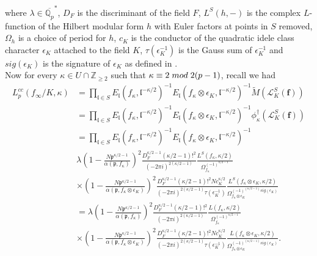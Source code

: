 \documentclass[reqno,10pt]{amsart}
\newcommand{\qp}{\mathbb{Q}_{p}}
\newcommand{\z}{\mathbb{Z}}
\newcommand{\f}{\mathbf{f}}
\newcommand{\p}{\mathfrak{p}}
\theoremstyle{plain}
\theoremstyle{definition}
\begin{document}
where $\lambda \in \overline{\qp}^*$, $D_F$ is the discriminant of the field $F$, $L^S(h,-)$ is the complex $L$-function of the Hilbert modular form $h$ with Euler factors at points in $S$ removed, $\Omega_{h}$ is a choice of period for $h$, $c_K$ is the conductor of the quadratic idele class character $\epsilon_K$ attached to the field $K$, $\tau(\epsilon_K^{-1})$ is the Gauss sum of $\epsilon_K^{-1}$ and $sig(\epsilon_K)$ is the signature of $\epsilon_K$ as defined in \cite[Section 5.1]{MokHeegnerPoints}. \\
Now for every $\kappa \in U \cap \z_{\geq 2}$ such that $\kappa \equiv 2 \hspace{1mm} mod \hspace{1mm} 2(p-1)$, recall we had
\begin{align*}
    L_p^{cc}(f_\infty/K,\kappa) & = \prod_{\mathfrak{l} \in S} E_\mathfrak{l}(f_\kappa, \mathfrak{l}^{-\kappa/2})^{-1} E_\mathfrak{l}(f_\kappa \otimes \epsilon_K, \mathfrak{l}^{-\kappa/2})^{-1} \widetilde{M}(\mathcal{L}^S_K(\f)) \\
    & = \prod_{\mathfrak{l} \in S} E_\mathfrak{l}(f_\kappa, \mathfrak{l}^{-\kappa/2})^{-1} E_\mathfrak{l}(f_\kappa \otimes \epsilon_K, \mathfrak{l}^{-\kappa/2})^{-1} \phi_\kappa^\dagger(\mathcal{L}^S_K(\f)) \\
    & = \prod_{\mathfrak{l} \in S} E_\mathfrak{l}(f_\kappa, \mathfrak{l}^{-\kappa/2})^{-1} E_\mathfrak{l}(f_\kappa \otimes \epsilon_K, \mathfrak{l}^{-\kappa/2})^{-1} \\
    & \lambda \left(1 - \frac{N\p^{\kappa/2 - 1}}{\alpha(\p,f_\kappa)} \right)^2 \frac{D_F^{\kappa/2 - 1}(\kappa/2 - 1)!^2}{(-2\pi i)^{2(\kappa/2-1)}} \frac{L^S(f_\kappa,\kappa/2)}{\Omega_{f_{\kappa}}^{(-1)^{\kappa/2-1}}} \\
    & \times \left(1 - \frac{N\p^{\kappa/2 - 1}}{\alpha(\p,f_\kappa \otimes \epsilon_K)} \right)^2 \frac{D_F^{\kappa/2 - 1}(\kappa/2 - 1)!^2 Nc_K^{\kappa/2}}{(-2\pi i)^{2(\kappa/2-1)} \tau(\epsilon_K^{-1})} \frac{L^S(f_\kappa \otimes \epsilon_K,\kappa/2)}{\Omega_{f_{\kappa} \otimes \epsilon_K}^{(-1)^{(\kappa/2-1)}sig(\epsilon_K)}} \\
    & = \lambda \left(1 - \frac{N\p^{\kappa/2 - 1}}{\alpha(\p,f_\kappa)} \right)^2 \frac{D_F^{\kappa/2 - 1}(\kappa/2 - 1)!^2}{(-2\pi i)^{2(\kappa/2-1)}} \frac{L(f_\kappa,\kappa/2)}{\Omega_{f_{\kappa}}^{(-1)^{\kappa/2-1}}} \\
    & \times \left(1 - \frac{N\p^{\kappa/2 - 1}}{\alpha(\p,f_\kappa \otimes \epsilon_K)} \right)^2 \frac{D_F^{\kappa/2 - 1}(\kappa/2 - 1)!^2 Nc_K^{\kappa/2}}{(-2\pi i)^{2(\kappa/2-1)} \tau(\epsilon_K^{-1})} \frac{L(f_\kappa \otimes \epsilon_K,\kappa/2)}{\Omega_{f_{\kappa} \otimes \epsilon_K}^{(-1)^{(\kappa/2-1)}sig(\epsilon_K)}}.
\end{align*}
\end{document}
